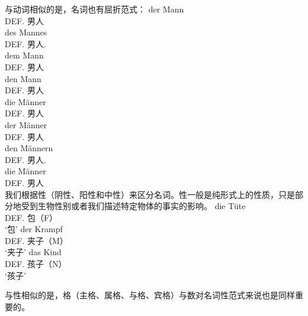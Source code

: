 与动词相似的是，名词也有屈折范式：
\eal
\ex 
\gll der Mann\\
	 DEF.\nom{} 男人\\
\ex 
\gll des Mannes\\
	 DEF.\gen{} 男人.\gen{}\\
\ex 
\gll dem Mann\\
	 DEF.\dat{} 男人\\
\ex 
\gll den Mann\\
	 DEF.\acc{} 男人\\
\ex 
\gll die Männer\\
	 DEF.\nom{} 男人\\
\ex 
\gll der Männer\\
	 DEF.\gen{} 男人\\
\ex 
\gll den Männern\\
	 DEF.\dat{} 男人.\dat\\
\ex 
\gll die Männer\\
	 DEF.\acc{} 男人\\
\zl
我们根据性（阴性、阳性和中性）来区分名词。性一般是纯形式上的性质，只是部分地受到生物性别或者我们描述特定物体的事实的影响。
\eal
\ex
\gll die Tüte\\
	 DEF.\fem{} 包（F）\\
\glt `包'
\ex 
\gll der Krampf\\
	 DEF.\mas{} 夹子（M）\\
\glt `夹子'
\ex 
\gll das Kind\\
	 DEF.\neu{} 孩子（N）\\
\glt `孩子'
\zl

与性相似的是，格（主格、属格、与格、宾格）与数对名词性范式来说也是同样重要的。

